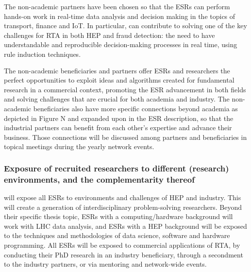 The non-academic partners have been chosen so that the ESRs can perform hands-on work in real-time data analysis and decision making in the topics of transport, finance and IoT. 
In particular, \ibmentity can contribute to solving one of the key challenges for RTA in both HEP and fraud detection: the need to have understandable and reproducible decision-making processes in real time, using rule induction techniques. 

The non-academic beneficiaries and partners offer ESRs and researchers the perfect opportunities to exploit ideas and algorithms created for fundamental research in a commercial context, promoting the ESR  advancement in both fields and solving challenges that are crucial for both academia and industry. The non-academic beneficiaries also have more specific connections beyond academia as depicted in Figure N and expanded upon in the ESR description, so that the industrial partners can benefit from each other's expertise and advance their business. Those connections will be discussed among partners and beneficiaries in topical meetings during the yearly network events. 


\vspace{-2mm}
\subsubsection{Exposure of recruited researchers to different (research) environments, and the complementarity thereof}
\label{sec:exposureComplementarity}

\acronym will expose all ESRs to environments and challenges of HEP and industry. This will create a generation of interdisciplinary problem-solving researchers.
Beyond their specific thesis topic, ESRs with a computing/hardware background will work with LHC data analysis, and ESRs with a HEP background will be exposed to the techniques and methodologies of data science, software and hardware programming.
All ESRs will be exposed to commercial applications of RTA, by conducting their PhD research in an industry beneficiary, through a secondment to the industry partners, or via mentoring and network-wide events. 

